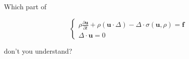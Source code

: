 \documentclass[crop, tikz, dvipsnames]{standalone}
\begin{document}
\color{font}
\begin{center}
Which part of

\begin{equation*}
    \begin{cases}
        \rho \frac{\partial{\boldsymbol{u}}}{\partial t} + \rho (\boldsymbol{u} \cdot \Delta) - \Delta \cdot \sigma (\boldsymbol{u}, \rho) = \boldsymbol{f} \\
        \Delta \cdot \boldsymbol{u} = 0
    \end{cases}
\end{equation*}

don't you understand?
\end{center}
\end{document}
